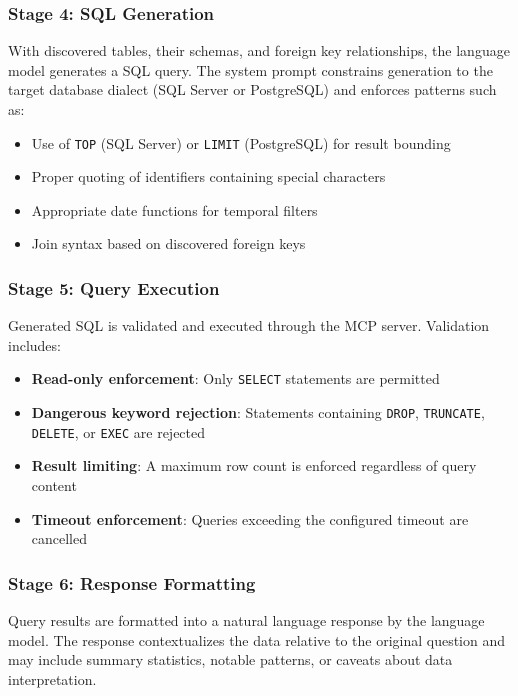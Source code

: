\subsubsection{Stage 4: SQL Generation}

With discovered tables, their schemas, and foreign key relationships, the language model generates a SQL query. The system prompt constrains generation to the target database dialect (SQL Server or PostgreSQL) and enforces patterns such as:

\begin{itemize}
    \item Use of \texttt{TOP} (SQL Server) or \texttt{LIMIT} (PostgreSQL) for result bounding
    \item Proper quoting of identifiers containing special characters
    \item Appropriate date functions for temporal filters
    \item Join syntax based on discovered foreign keys
\end{itemize}

\subsubsection{Stage 5: Query Execution}

Generated SQL is validated and executed through the MCP server. Validation includes:

\begin{itemize}
    \item \textbf{Read-only enforcement}: Only \texttt{SELECT} statements are permitted
    \item \textbf{Dangerous keyword rejection}: Statements containing \texttt{DROP}, \texttt{TRUNCATE}, \texttt{DELETE}, or \texttt{EXEC} are rejected
    \item \textbf{Result limiting}: A maximum row count is enforced regardless of query content
    \item \textbf{Timeout enforcement}: Queries exceeding the configured timeout are cancelled
\end{itemize}

\subsubsection{Stage 6: Response Formatting}

Query results are formatted into a natural language response by the language model. The response contextualizes the data relative to the original question and may include summary statistics, notable patterns, or caveats about data interpretation.

